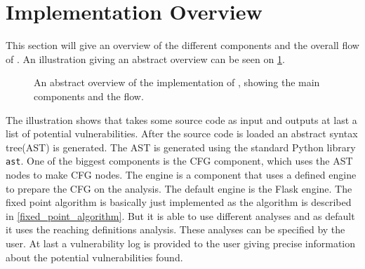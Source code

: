 \section{Implementation Overview}
This section will give an overview of the different components and the overall flow of \pyt{}.
An illustration giving an abstract overview can be seen on \cref{figure:implementation_overview}.

\begin{figure}
  
  \caption{An abstract overview of the implementation of \pyt{}, showing the main components and the flow.}
  \label{figure:implementation_overview}
\end{figure}

The illustration shows that \pyt{} takes some source code as input and outputs at last a list of potential vulnerabilities.
After the source code is loaded an abstract syntax tree(AST) is generated.
The AST is generated using the standard Python library \texttt{ast}\cite{python_ast}.
One of the biggest components is the CFG component, which uses the AST nodes to make CFG nodes.
The engine is a component that uses a defined engine to prepare the CFG on the analysis.
The default engine is the Flask engine.
The fixed point algorithm is basically just implemented as the algorithm is described in \cref{fixed_point_algorithm}.
But it is able to use different analyses and as default it uses the reaching definitions analysis.
These analyses can be specified by the user.
At last a vulnerability log is provided to the user giving precise information about the potential vulnerabilities found.
